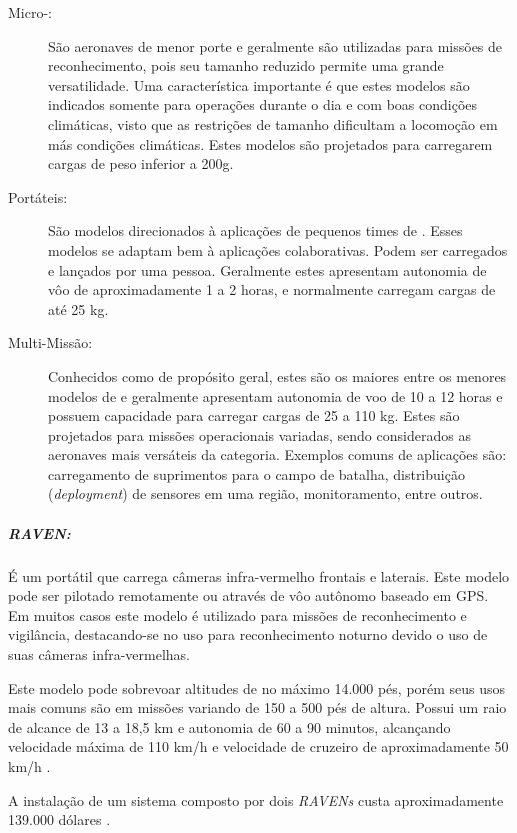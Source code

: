 \begin{description}

\item[Micro-\vants: ]
São aeronaves de menor porte e geralmente são utilizadas para missões de reconhecimento, pois seu tamanho reduzido permite uma grande versatilidade. Uma característica importante é que estes modelos são indicados somente para operações durante o dia e com boas condições climáticas, visto que as restrições de tamanho dificultam a locomoção em más condições climáticas. Estes modelos são projetados para carregarem cargas de peso inferior a 200g.

\item[Portáteis: ]
São modelos direcionados à aplicações de pequenos times de \vants. Esses modelos se adaptam bem à aplicações colaborativas. Podem ser carregados e lançados por uma pessoa. Geralmente estes \vants apresentam autonomia de vôo de aproximadamente 1 a 2 horas, e normalmente carregam cargas de até 25 kg.

\item[Multi-Missão: ]
Conhecidos como \vants  de propósito geral, estes são os maiores entre os menores modelos de \vants e geralmente apresentam autonomia de voo de 10 a 12 horas e possuem capacidade para carregar cargas de 25 a 110 kg. Estes \vants são projetados para missões operacionais variadas, sendo considerados as aeronaves mais versáteis da categoria. Exemplos comuns de aplicações são: carregamento de suprimentos para o campo de batalha, distribuição (\emph{deployment}) de sensores em uma região, monitoramento, entre outros.

\end{description}


\subparagraph{\emph{RAVEN}:}
É um \vant portátil que carrega câmeras infra-vermelho frontais e laterais. Este modelo pode ser pilotado remotamente ou através de vôo autônomo baseado em GPS. Em muitos casos 
este modelo é utilizado para missões de reconhecimento e vigilância, destacando-se no uso para reconhecimento noturno devido o uso de suas câmeras infra-vermelhas.

Este modelo pode sobrevoar altitudes de no máximo 14.000 pés, porém seus usos mais comuns são em missões variando de 150 a 500 pés de altura. Possui um raio de alcance de 
13 a 18,5 km e autonomia de 60 a 90 minutos, alcançando velocidade máxima de 110 km/h e velocidade de cruzeiro de aproximadamente 50 km/h \cite{uas_2009}. 

A instalação de um sistema composto por dois \emph{RAVENs} custa aproximadamente 139.000 dólares \cite{Drew2005}. 

